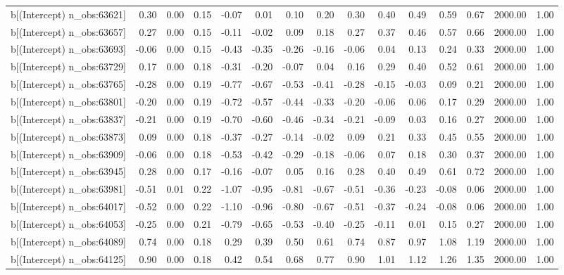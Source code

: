 \begin{table}[ht]
\begin{tabular}{rrrrrrrrrrrrrrr}
  b[(Intercept) n\_obs:63621] & 0.30 & 0.00 & 0.15 & -0.07 & 0.01 & 0.10 & 0.20 & 0.30 & 0.40 & 0.49 & 0.59 & 0.67 & 2000.00 & 1.00 \\ 
  b[(Intercept) n\_obs:63657] & 0.27 & 0.00 & 0.15 & -0.11 & -0.02 & 0.09 & 0.18 & 0.27 & 0.37 & 0.46 & 0.57 & 0.66 & 2000.00 & 1.00 \\ 
  b[(Intercept) n\_obs:63693] & -0.06 & 0.00 & 0.15 & -0.43 & -0.35 & -0.26 & -0.16 & -0.06 & 0.04 & 0.13 & 0.24 & 0.33 & 2000.00 & 1.00 \\ 
  b[(Intercept) n\_obs:63729] & 0.17 & 0.00 & 0.18 & -0.31 & -0.20 & -0.07 & 0.04 & 0.16 & 0.29 & 0.40 & 0.52 & 0.61 & 2000.00 & 1.00 \\ 
  b[(Intercept) n\_obs:63765] & -0.28 & 0.00 & 0.19 & -0.77 & -0.67 & -0.53 & -0.41 & -0.28 & -0.15 & -0.03 & 0.09 & 0.21 & 2000.00 & 1.00 \\ 
  b[(Intercept) n\_obs:63801] & -0.20 & 0.00 & 0.19 & -0.72 & -0.57 & -0.44 & -0.33 & -0.20 & -0.06 & 0.06 & 0.17 & 0.29 & 2000.00 & 1.00 \\ 
  b[(Intercept) n\_obs:63837] & -0.21 & 0.00 & 0.19 & -0.70 & -0.60 & -0.46 & -0.34 & -0.21 & -0.09 & 0.03 & 0.16 & 0.27 & 2000.00 & 1.00 \\ 
  b[(Intercept) n\_obs:63873] & 0.09 & 0.00 & 0.18 & -0.37 & -0.27 & -0.14 & -0.02 & 0.09 & 0.21 & 0.33 & 0.45 & 0.55 & 2000.00 & 1.00 \\ 
  b[(Intercept) n\_obs:63909] & -0.06 & 0.00 & 0.18 & -0.53 & -0.42 & -0.29 & -0.18 & -0.06 & 0.07 & 0.18 & 0.30 & 0.37 & 2000.00 & 1.00 \\ 
  b[(Intercept) n\_obs:63945] & 0.28 & 0.00 & 0.17 & -0.16 & -0.07 & 0.05 & 0.16 & 0.28 & 0.40 & 0.49 & 0.61 & 0.72 & 2000.00 & 1.00 \\ 
  b[(Intercept) n\_obs:63981] & -0.51 & 0.01 & 0.22 & -1.07 & -0.95 & -0.81 & -0.67 & -0.51 & -0.36 & -0.23 & -0.08 & 0.06 & 2000.00 & 1.00 \\ 
  b[(Intercept) n\_obs:64017] & -0.52 & 0.00 & 0.22 & -1.10 & -0.96 & -0.80 & -0.67 & -0.51 & -0.37 & -0.24 & -0.08 & 0.06 & 2000.00 & 1.00 \\ 
  b[(Intercept) n\_obs:64053] & -0.25 & 0.00 & 0.21 & -0.79 & -0.65 & -0.53 & -0.40 & -0.25 & -0.11 & 0.01 & 0.15 & 0.27 & 2000.00 & 1.00 \\ 
  b[(Intercept) n\_obs:64089] & 0.74 & 0.00 & 0.18 & 0.29 & 0.39 & 0.50 & 0.61 & 0.74 & 0.87 & 0.97 & 1.08 & 1.19 & 2000.00 & 1.00 \\ 
  b[(Intercept) n\_obs:64125] & 0.90 & 0.00 & 0.18 & 0.42 & 0.54 & 0.68 & 0.77 & 0.90 & 1.01 & 1.12 & 1.26 & 1.35 & 2000.00 & 1.00 \\ 

\end{tabular}
\end{table}
